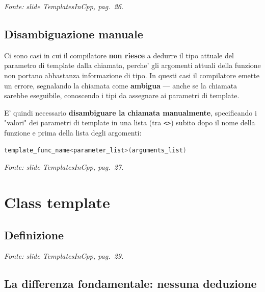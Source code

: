 \documentclass{report}
\newcommand{\code}[1]{\texttt{\small #1}}
\newcommand{\fonteslide}[1]{{\footnotesize\itshape\color{gray} Fonte: slide \emph{TemplatesInCpp}, pag.~#1.\par}}
\begin{document}
\fonteslide{26}

\section{Disambiguazione manuale}

Ci sono casi in cui il compilatore \textbf{non riesce} a dedurre il tipo
attuale del parametro di template dalla chiamata, perche' gli argomenti
attuali della funzione non portano abbastanza informazione di tipo. In questi
casi il compilatore emette un errore, segnalando la chiamata come
\textbf{ambigua} --- anche se la chiamata sarebbe eseguibile, conoscendo i
tipi da assegnare ai parametri di template.

E' quindi necessario \textbf{disambiguare la chiamata manualmente},
specificando i "valori" dei parametri di template in una lista (tra
\code{<>}) subito dopo il nome della funzione e prima della lista degli
argomenti:
\begin{lstlisting}[language=C++]
template_func_name<parameter_list>(arguments_list)
\end{lstlisting}

\fonteslide{27}

\chapter{Class template}\label{ch:class}

\section{Definizione}


\fonteslide{29}

\section{La differenza fondamentale: nessuna deduzione}

\end{document}
